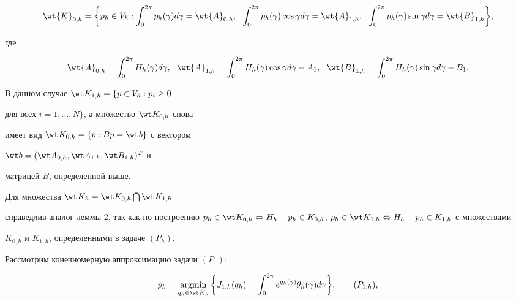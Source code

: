 $$


\wt{K}_{0,h}=\bigg\{p_h \in V_h:


\int_{0}^{2\pi} p_h(\gamma) d\gamma=\wt{A}_{0,h}, \ \


\int_{0}^{2\pi} p_h(\gamma)\cos\gamma d\gamma =\wt{A}_{1,h},


\ \ \int_{0}^{2\pi} p_h(\gamma)\sin\gamma d\gamma=\wt{B}_{1,h} \bigg\},


$$


где


$$


\wt{A}_{0,h}=\int_{0}^{2\pi} H_h(\gamma)d\gamma, \ \


\wt{A}_{1,h}=\int_{0}^{2\pi} H_h(\gamma)\cos \gamma


d\gamma-A_1, \ \ \wt{B}_{1,h}=\int_{0}^{2\pi} H_h(\gamma)\sin


\gamma d\gamma-B_1.


$$


В данном случае $\wt K_{1,h}=\{p\in V_h: p_i \geq 0$


для всех $i=1,\dotsc,N \}$, а множество $\wt K_{0,h}$ снова


имеет вид $\wt K_{0,h}=\{p: Bp=\wt b\}$ с вектором


$\wt b=(\wt A_{0,h}, \wt A_{1,h}, \wt B_{1,h})^T$ и


матрицей $B$, определенной выше.





Для множества $\wt K_h= \wt K_{0,h}\bigcap \wt K_{1,h}$


справедлив аналог леммы 2, так как по построению $p_h\in \wt


K_{0,h}\Leftrightarrow H_h-p_h\in K_{0,h}$, $p_h\in \wt


K_{1,h}\Leftrightarrow H_h-p_h\in K_{1,h}$ с множествами


$K_{0,h}$ и $K_{1,h}$, определенными в задаче $(P_h)$.





Рассмотрим конечномерную аппроксимацию задачи $(P_{1})$:


\begin{equation}


p_h=\argmin\limits_{q_h\in \wt K_h} \bigg\{


J_{1,h}(q_h)=\int_{0}^{2\pi}


e^{q_{h}(\gamma)}\theta_h(\gamma)d\gamma \bigg \},


\tag{$P_{1,h}$},


\end{equation}


